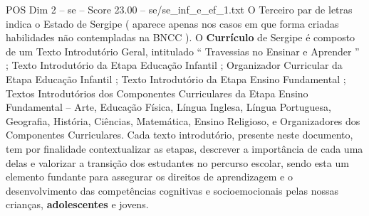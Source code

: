 \begin{textsample}{POS Dim 2 – se – Score 23.00 – se/se\_inf\_e\_ef\_1.txt}
O Terceiro par de letras indica o Estado de Sergipe ( aparece apenas nos casos em que forma criadas habilidades não contempladas na BNCC ).
O \textbf{Currículo} de Sergipe é composto de um Texto Introdutório Geral, intitulado “ Travessias no Ensinar e Aprender ” ; Texto Introdutório da Etapa Educação Infantil ; Organizador Curricular da Etapa Educação Infantil ; Texto Introdutório da Etapa Ensino Fundamental ; Textos Introdutórios dos Componentes Curriculares da Etapa Ensino Fundamental – Arte, Educação Física, Língua Inglesa, Língua Portuguesa, Geografia, História, Ciências, Matemática, Ensino Religioso, e Organizadores dos Componentes Curriculares.
Cada texto introdutório, presente neste documento, tem por finalidade contextualizar as etapas, descrever a importância de cada uma delas e valorizar a transição dos estudantes no percurso escolar, sendo esta um elemento fundante para assegurar os direitos de aprendizagem e o desenvolvimento das competências cognitivas e socioemocionais pelas nossas crianças, \textbf{adolescentes} e jovens.

\end{textsample}
